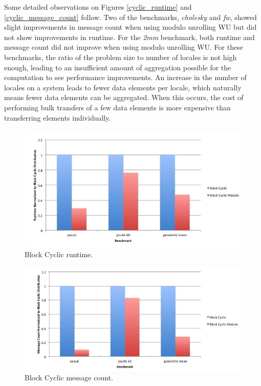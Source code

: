 Some detailed observations on Figures \ref{cyclic_runtime} and \ref{cyclic_message_count} follow. Two of the benchmarks, \textit{cholesky} and \textit{fw}, showed slight improvements in message count when using modulo unrolling WU but did not show improvements in runtime. For the \textit{2mm} benchmark, both runtime and message count did not improve when using modulo unrolling WU. For these benchmarks, the ratio of the problem size to number of locales is not high enough, leading to an insufficient amount of aggregation possible for the computation to see performance improvements. An increase in the number of locales on a system leads to fewer data elements per locale, which naturally means fewer data elements can be aggregated. When this occurs, the cost of performing bulk transfers of a few data elements is more expensive than transferring elements individually. 

\begin{figure}
\begin{center}
\includegraphics[scale=0.30]{./Figures/block_cyclic_runtime}
\caption{Block Cyclic runtime.}
\label{block_cyclic_runtime}
\end{center}
\end{figure}

\begin{figure}
\begin{center}
\includegraphics[scale=0.30]{./Figures/block_cyclic_message_count}
\caption{Block Cyclic message count.}
\label{block_cyclic_message_count}
\end{center}
\end{figure}

